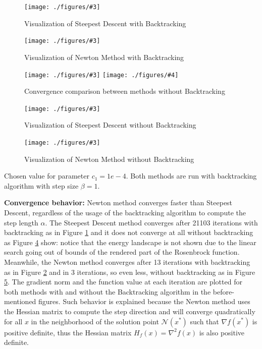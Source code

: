 \documentclass[unicode,11pt,a4paper,oneside,numbers=endperiod,openany]{scrartcl}
\newcommand{\myFigureEnergy}[3]{
    \begin{figure}[h]
    \centering
    \caption{#1}
    \label{#2}
    \texttt{[image: ./figures/\#3]}
    \end{figure}
}
\newcommand{\myFigureComparison}[4]{
    \begin{figure}[H]
    \centering
    \caption{#1}
    \label{#2}
    \texttt{[image: ./figures/\#3]}
    \texttt{[image: ./figures/\#4]}
    \end{figure}
}
\begin{document}
\myFigureEnergy
    {Visualization of Steepest Descent with Backtracking}
    {fig:ex1-sd-backtracking-energy}
    {ex1-sd-backtracking-energy.eps}

\myFigureEnergy
    {Visualization of Newton Method with Backtracking}
    {fig:ex1-newton-energy-backtracking}
    {ex1-newton-backtracking-energy.eps}

\myFigureComparison
    {Convergence comparison between methods without Backtracking}
    {fig:ex1-convergence-comparison}
    {ex1-sd-convergence.eps}
    {ex1-newton-convergence.eps}

\myFigureEnergy
    {Visualization of Steepest Descent without Backtracking}
    {fig:ex1-sd-energy}
    {ex1-sd-energy.eps}

\myFigureEnergy
    {Visualization of Newton Method without Backtracking}
    {fig:ex1-newton-energy}
    {ex1-newton-energy.eps}

Chosen value for parameter $c_1 = 1e-4$. 
Both methods are run with backtracking algorithm with step size $\beta = 1$.
\newline

\textbf{Convergence behavior:}
Newton method converges faster than Steepest Descent, 
regardless of the usage of the backtracking algorithm to compute the step length $\alpha$.
The Steepest Descent method converges after 21103 iterations with backtracking 
as in Figure \ref{fig:ex1-sd-backtracking-energy}
and it does not converge at all without backtracking as Figure \ref{fig:ex1-sd-energy} show:
notice that the energy landscape is not shown due to the linear search going out of bounds of the rendered 
part of the Rosenbrock function. 
Meanwhile, the Newton method converges after 13 iterations with backtracking 
as in Figure \ref{fig:ex1-newton-energy-backtracking} and in 3 iterations, 
so even less, without backtracking as in Figure \ref{fig:ex1-newton-energy}.
The gradient norm and the function value at each iteration are plotted for both methods 
with and without the Backtracking algorithm in the before-mentioned figures.
Such behavior is explained because the Newton method uses the Hessian matrix to compute the step direction
and will converge quadratically for all $x$ in the neighborhood of the solution point $\mathcal{N}(x^*)$ 
such that $\nabla f(x^*)$ is positive definite,
thus the Hessian matrix $H_f(x) = \nabla^2 f(x)$ is also positive definite.
\newline
\end{document}

